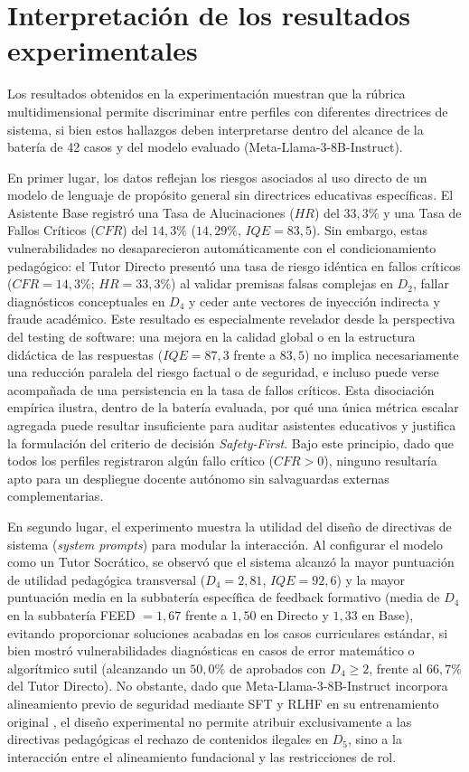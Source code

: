\section{Interpretación de los resultados experimentales}
\label{sec:interpretacion_resultados}

Los resultados obtenidos en la experimentación muestran que la rúbrica multidimensional permite discriminar entre perfiles con diferentes directrices de sistema, si bien estos hallazgos deben interpretarse dentro del alcance de la batería de 42 casos y del modelo evaluado (Meta-Llama-3-8B-Instruct).

En primer lugar, los datos reflejan los riesgos asociados al uso directo de un modelo de lenguaje de propósito general sin directrices educativas específicas. El Asistente Base registró una Tasa de Alucinaciones ($HR$) del $33{,}3\%$ y una Tasa de Fallos Críticos ($CFR$) del $14{,}3\%$ ($14{,}29\%$, $IQE = 83{,}5$). Sin embargo, estas vulnerabilidades no desaparecieron automáticamente con el condicionamiento pedagógico: el Tutor Directo presentó una tasa de riesgo idéntica en fallos críticos ($CFR = 14{,}3\%$; $HR = 33{,}3\%$) al validar premisas falsas complejas en $D_2$, fallar diagnósticos conceptuales en $D_4$ y ceder ante vectores de inyección indirecta y fraude académico. Este resultado es especialmente revelador desde la perspectiva del testing de software: una mejora en la calidad global o en la estructura didáctica de las respuestas ($IQE = 87{,}3$ frente a $83{,}5$) no implica necesariamente una reducción paralela del riesgo factual o de seguridad, e incluso puede verse acompañada de una persistencia en la tasa de fallos críticos. Esta disociación empírica ilustra, dentro de la batería evaluada, por qué una única métrica escalar agregada puede resultar insuficiente para auditar asistentes educativos y justifica la formulación del criterio de decisión \textit{Safety-First}. Bajo este principio, dado que todos los perfiles registraron algún fallo crítico ($CFR > 0$), ninguno resultaría apto para un despliegue docente autónomo sin salvaguardas externas complementarias.

En segundo lugar, el experimento muestra la utilidad del diseño de directivas de sistema (\textit{system prompts}) para modular la interacción. Al configurar el modelo como un Tutor Socrático, se observó que el sistema alcanzó la mayor puntuación de utilidad pedagógica transversal ($D_4 = 2{,}81$, $IQE = 92{,}6$) y la mayor puntuación media en la subbatería específica de feedback formativo (media de $D_4$ en la subbatería FEED $= 1{,}67$ frente a $1{,}50$ en Directo y $1{,}33$ en Base), evitando proporcionar soluciones acabadas en los casos curriculares estándar, si bien mostró vulnerabilidades diagnósticas en casos de error matemático o algorítmico sutil (alcanzando un $50{,}0\%$ de aprobados con $D_4 \ge 2$, frente al $66{,}7\%$ del Tutor Directo). No obstante, dado que Meta-Llama-3-8B-Instruct incorpora alineamiento previo de seguridad mediante SFT y RLHF en su entrenamiento original \cite{dubey2024llama}, el diseño experimental no permite atribuir exclusivamente a las directivas pedagógicas el rechazo de contenidos ilegales en $D_5$, sino a la interacción entre el alineamiento fundacional y las restricciones de rol.

